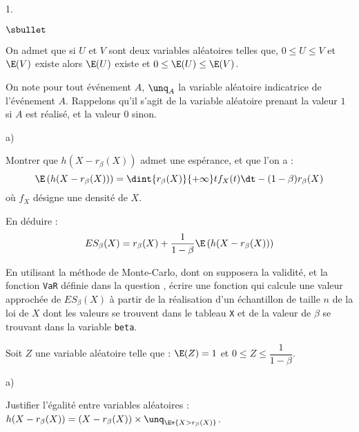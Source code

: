 \documentclass[11pt]{article}%
\begin{document}
\begin{noliste}{1.}
\begin{noliste}{$\sbullet$}
    \item On admet que si $U$ et $V$ sont deux variables 
    aléatoires telles que, $0 \leq U \leq V$ et $\E(V)$ existe 
    alors $\E(U)$ existe et $0 \leq \E(U) \leq \E(V)$.
    
    \item On note pour tout événement $A$, 
    $\unq_A$ la variable aléatoire indicatrice de 
    l'événement $A$. Rappelons qu'il s'agit de la variable 
    aléatoire prenant la valeur $1$ si $A$ est réalisé, et la 
    valeur $0$ sinon.
  \end{noliste}
  
  \item
  \begin{noliste}{a)}
    \setlength{\itemsep}{2mm}
    \item Montrer que $h(X-r_\beta(X))$ admet une espérance, et 
    que l'on a :
    \[
      \E\left(h(X-r_\beta(X))\right)=\dint{r_\beta(X)}{+\infty} t 
      f_X(t) \dt - (1-\beta)r_\beta(X)
    \]
    où $f_X$ désigne une densité de $X$.
    
    

    
    \item En déduire : 
    \[
      ES_\beta(X)=r_\beta(X)+\dfrac{1}{1-\beta} 
      \E\left(h(X-r_\beta(X))\right)
    \]
    
    
  \end{noliste}
  
  
  
  
  
  
  \item En utilisant la méthode de Monte-Carlo, dont on supposera 
  la validité, et la fonction {\tt VaR} définie dans la question 
  , écrire une fonction \Scilab{} qui calcule une valeur 
  approchée de $ES_\beta(X)$ à partir de la réalisation d'un 
  échantillon de taille $n$ de la loi de $X$ dont les valeurs se 
  trouvent dans le tableau \Scilab{} {\tt X} et de la valeur de 
  $\beta$ se trouvant dans la variable \Scilab{} {\tt beta}.
  
  
  
  \item Soit $Z$ une variable aléatoire telle que : 
  $\E(Z)=1$ et $0\leq Z \leq \dfrac1{1-\beta}$.
  \begin{noliste}{a)}
    \setlength{\itemsep}{2mm}
    \item Justifier l'égalité entre variables aléatoires : 
    $h(X-r_\beta(X))=(X-r_\beta(X)) \times \unq_{\Ev{X > 
    r_\beta(X)}}$.
    

\end{noliste}
\end{noliste}
\end{document}
